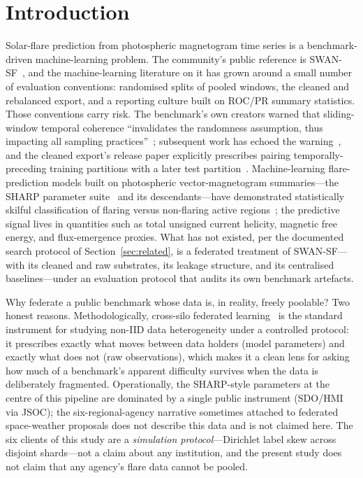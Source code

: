 \section{Introduction}\label{sec:intro}

Solar-flare prediction from photospheric magnetogram time series is a
benchmark-driven machine-learning problem. The community's public
reference is SWAN-SF~\cite{angryk2020}, and the machine-learning
literature on it has grown around a small number of evaluation
conventions: randomised splits of pooled windows, the cleaned and
rebalanced export, and a reporting culture built on ROC/PR summary
statistics. Those conventions carry risk. The benchmark's own creators
warned that sliding-window temporal coherence ``invalidates the
randomness assumption, thus impacting all sampling practices''~\cite{angryk2019};
subsequent work has echoed the warning~\cite{ahmadzadeh2021}, and the
cleaned export's release paper explicitly prescribes pairing
temporally-preceding training partitions with a later test
partition~\cite{eskandari2024}. Machine-learning flare-prediction
models built on photospheric vector-magnetogram
summaries---the SHARP parameter suite~\cite{bobra2015} and its
descendants---have demonstrated statistically skilful classification of
flaring versus non-flaring active regions~\cite{leka2019,georgoulis2021};
the predictive signal lives in quantities such as total unsigned
current helicity, magnetic free energy, and flux-emergence proxies. What
has not existed, per the documented search protocol of
Section~\ref{sec:related}, is a federated treatment of SWAN-SF---with
its cleaned and raw substrates, its leakage structure, and its
centralised baselines---under an evaluation protocol that audits its own
benchmark artefacts.

Why federate a public benchmark whose data is, in reality, freely
poolable? Two honest reasons. Methodologically, cross-silo federated
learning~\cite{mcmahan2017,kairouz2021} is the standard instrument for
studying non-IID data heterogeneity under a controlled protocol: it
prescribes exactly what moves between data holders (model parameters)
and exactly what does not (raw observations), which makes it a clean
lens for asking how much of a benchmark's apparent difficulty survives
when the data is deliberately fragmented. Operationally, the
SHARP-style parameters at the centre of this pipeline are dominated by
a single public instrument (SDO/HMI via JSOC); the six-regional-agency
narrative sometimes attached to federated space-weather proposals does
not describe this data and is not claimed here. The six clients of
this study are a \emph{simulation protocol}---Dirichlet label skew
across disjoint shards---not a claim about any institution, and the
present study does not claim that any agency's flare data cannot be
pooled.

